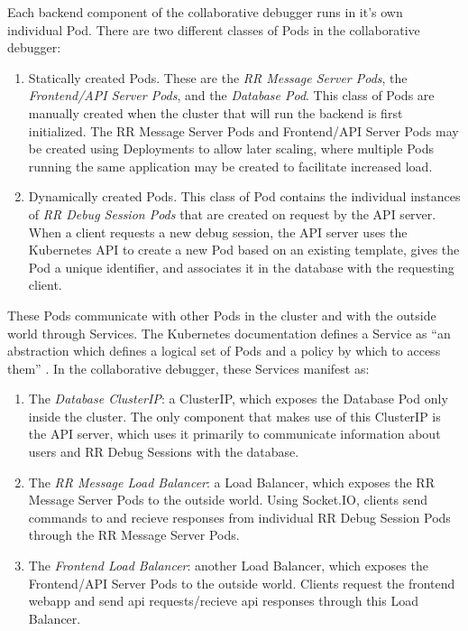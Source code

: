 \documentclass[12pt]{article}
\begin{document}
Each backend component of the collaborative debugger runs in it's own
individual Pod.  There are two different classes of Pods in the
collaborative debugger:

\begin{enumerate}
\item Statically created Pods.  These are the \textit{RR Message
    Server Pods}, the \textit{Frontend/API Server Pods}, and the
  \textit{Database Pod}.  This class of Pods are manually created when
  the cluster that will run the backend is first initialized.  The RR
  Message Server Pods and Frontend/API Server Pods may be created
  using Deployments \cite{k8s_docs} to allow later scaling, where
  multiple Pods running the same application may be created to
  facilitate increased load.
\item Dynamically created Pods.  This class of Pod contains the
  individual instances of \textit{RR Debug Session Pods} that are
  created on request by the API server.  When a client requests a new
  debug session, the API server uses the Kubernetes API to create a
  new Pod based on an existing template, gives the Pod a unique
  identifier, and associates it in the database with the requesting
  client.
\end{enumerate}

These Pods communicate with other Pods in the cluster and with the
outside world through Services.  The Kubernetes documentation defines
a Service as ``an abstraction which defines a logical set of Pods and
a policy by which to access them'' \cite{k8s_docs}.  In the
collaborative debugger, these Services manifest as:

\begin{enumerate}
\item The \textit{Database ClusterIP}: a ClusterIP, which exposes the
  Database Pod only inside the cluster.  The only component that makes
  use of this ClusterIP is the API server, which uses it primarily to
  communicate information about users and RR Debug Sessions with the
  database.
\item The \textit{RR Message Load Balancer}: a Load Balancer, which
  exposes the RR Message Server Pods to the outside world.  Using
  Socket.IO, clients send commands to and recieve responses from
  individual RR Debug Session Pods through the RR Message Server Pods.
\item The \textit{Frontend Load Balancer}: another Load Balancer,
  which exposes the Frontend/API Server Pods to the outside world.
  Clients request the frontend webapp and send api requests/recieve
  api responses through this Load Balancer.
\end{enumerate}
\end{document}
